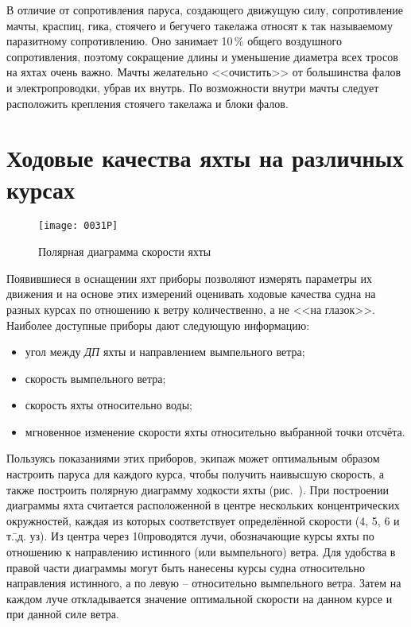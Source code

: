 В отличие от сопротивления паруса, создающего движущую силу, сопротивление мачты, краспиц, гика, стоячего и бегучего такелажа относят к так называемому паразитному сопротивлению. Оно занимает 10\,\% общего воздушного сопротивления, поэтому сокращение длины и уменьшение диаметра всех тросов на яхтах очень важно. Мачты желательно <<очистить>> от большинства фалов и электропроводки, убрав их внутрь. По возможности внутри мачты следует расположить крепления стоячего такелажа и блоки фалов.

\section{Ходовые качества яхты на различных курсах}

\begin{figure}[htb]
  \centering
  \texttt{[image: 0031P]}
  \caption{Полярная диаграмма скорости яхты}
  \label{fig:31}
\end{figure}

Появившиеся в оснащении яхт приборы позволяют измерять параметры их движения и на основе этих измерений оценивать ходовые качества судна на разных курсах по отношению к ветру количественно, а не <<на глазок>>. Наиболее доступные приборы дают следующую информацию:

\begin{itemize}
\item угол между \textit{ДП} яхты и направлением вымпельного ветра; 
\item скорость вымпельного ветра; 
\item скорость яхты относительно воды; 
\item мгновенное изменение скорости яхты относительно выбранной точки отсчёта. 
\end{itemize}

Пользуясь показаниями этих приборов, экипаж может оптимальным образом настроить паруса для каждого курса, чтобы получить наивысшую скорость, а также построить полярную диаграмму ходкости яхты (рис.~). При построении диаграммы яхта считается расположенной в центре нескольких концентрических окружностей, каждая из которых соответствует определённой скорости (4, 5, 6 и т.\=,д. уз). Из центра через 10\gr проводятся лучи, обозначающие курсы яхты по отношению к направлению истинного (или вымпельного) ветра. Для удобства в правой части диаграммы могут быть нанесены курсы судна относительно направления истинного, а по левую \--- относительно вымпельного ветра. Затем на каждом луче откладывается значение оптимальной скорости на данном курсе и при данной силе ветра.


